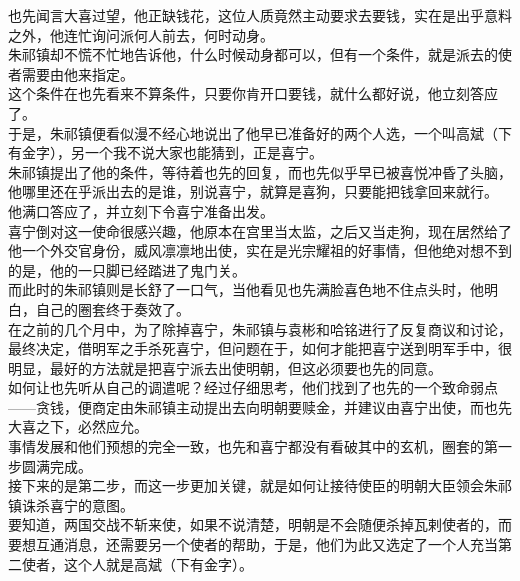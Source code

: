 \begin{multicols}{\theparacolNo}
也先闻言大喜过望，他正缺钱花，这位人质竟然主动要求去要钱，实在是出乎意料之外，他连忙询问派何人前去，何时动身。\\

朱祁镇却不慌不忙地告诉他，什么时候动身都可以，但有一个条件，就是派去的使者需要由他来指定。\\

这个条件在也先看来不算条件，只要你肯开口要钱，就什么都好说，他立刻答应了。\\

于是，朱祁镇便看似漫不经心地说出了他早已准备好的两个人选，一个叫高斌（下有金字），另一个我不说大家也能猜到，正是喜宁。\\

朱祁镇提出了他的条件，等待着也先的回复，而也先似乎早已被喜悦冲昏了头脑，他哪里还在乎派出去的是谁，别说喜宁，就算是喜狗，只要能把钱拿回来就行。\\

他满口答应了，并立刻下令喜宁准备出发。\\

喜宁倒对这一使命很感兴趣，他原本在宫里当太监，之后又当走狗，现在居然给了他一个外交官身份，威风凛凛地出使，实在是光宗耀祖的好事情，但他绝对想不到的是，他的一只脚已经踏进了鬼门关。\\

而此时的朱祁镇则是长舒了一口气，当他看见也先满脸喜色地不住点头时，他明白，自己的圈套终于奏效了。\\

在之前的几个月中，为了除掉喜宁，朱祁镇与袁彬和哈铭进行了反复商议和讨论，最终决定，借明军之手杀死喜宁，但问题在于，如何才能把喜宁送到明军手中，很明显，最好的方法就是把喜宁派去出使明朝，但这必须要也先的同意。\\

如何让也先听从自己的调遣呢？经过仔细思考，他们找到了也先的一个致命弱点——贪钱，便商定由朱祁镇主动提出去向明朝要赎金，并建议由喜宁出使，而也先大喜之下，必然应允。\\

事情发展和他们预想的完全一致，也先和喜宁都没有看破其中的玄机，圈套的第一步圆满完成。\\

接下来的是第二步，而这一步更加关键，就是如何让接待使臣的明朝大臣领会朱祁镇诛杀喜宁的意图。\\

要知道，两国交战不斩来使，如果不说清楚，明朝是不会随便杀掉瓦剌使者的，而要想互通消息，还需要另一个使者的帮助，于是，他们为此又选定了一个人充当第二使者，这个人就是高斌（下有金字）。\\


\end{multicols}
